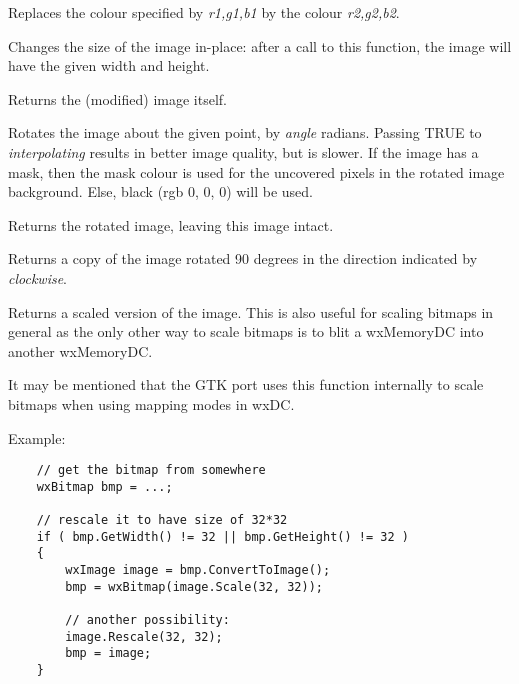 Replaces the colour specified by {\it r1,g1,b1} by the colour {\it r2,g2,b2}.

\label{wximagerescale}


Changes the size of the image in-place: after a call to this function, the
image will have the given width and height.

Returns the (modified) image itself.



\label{wximagerotate}


Rotates the image about the given point, by {\it angle} radians. Passing TRUE
to {\it interpolating} results in better image quality, but is slower. If the
image has a mask, then the mask colour is used for the uncovered pixels in the
rotated image background. Else, black (rgb 0, 0, 0) will be used.

Returns the rotated image, leaving this image intact.

\label{wximagerotate90}


Returns a copy of the image rotated 90 degrees in the direction
indicated by {\it clockwise}.

\label{wximagescale}


Returns a scaled version of the image. This is also useful for
scaling bitmaps in general as the only other way to scale bitmaps
is to blit a wxMemoryDC into another wxMemoryDC.

It may be mentioned that the GTK port uses this function internally
to scale bitmaps when using mapping modes in wxDC. 

Example:

\begin{verbatim}
    // get the bitmap from somewhere
    wxBitmap bmp = ...;

    // rescale it to have size of 32*32
    if ( bmp.GetWidth() != 32 || bmp.GetHeight() != 32 )
    {
        wxImage image = bmp.ConvertToImage();
        bmp = wxBitmap(image.Scale(32, 32));

        // another possibility:
        image.Rescale(32, 32);
        bmp = image;
    }

\end{verbatim}

